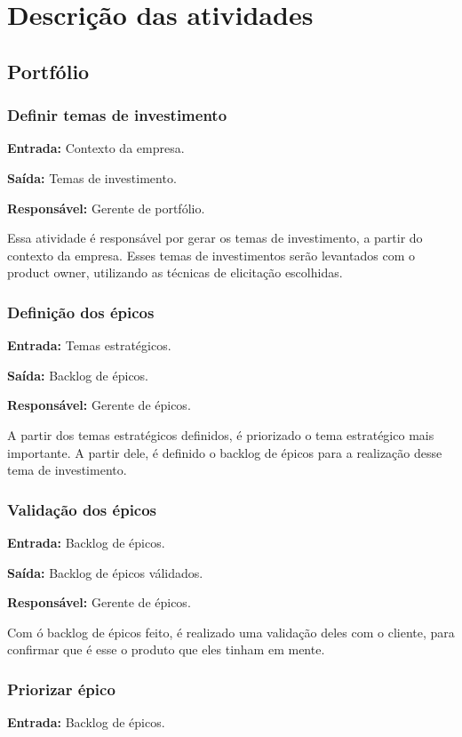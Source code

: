 \section{Descrição das atividades}

\subsection{Portfólio}
  \subsubsection{Definir temas de investimento}
    \textbf{Entrada:} Contexto da empresa.

    \textbf{Saída:} Temas de investimento.

    \textbf{Responsável:} Gerente de portfólio.

    Essa atividade é responsável por gerar os temas de investimento, a partir do contexto da empresa. Esses temas de investimentos serão levantados com o product owner, utilizando as técnicas de elicitação escolhidas.

  \subsubsection{Definição dos épicos}
    \textbf{Entrada:} Temas estratégicos.

    \textbf{Saída:} Backlog de épicos.

    \textbf{Responsável:} Gerente de épicos.
    
    A partir dos temas estratégicos definidos, é priorizado o tema estratégico mais importante. A partir dele, é definido o backlog de épicos para a realização desse tema de investimento.

  \subsubsection{Validação dos épicos}
    \textbf{Entrada:} Backlog de épicos.

    \textbf{Saída:} Backlog de épicos válidados.

    \textbf{Responsável:} Gerente de épicos.
    
    Com ó backlog de épicos feito, é realizado uma validação deles com o cliente, para confirmar que é esse o produto que eles tinham em mente.

  \subsubsection{Priorizar épico}
    \textbf{Entrada:} Backlog de épicos.

